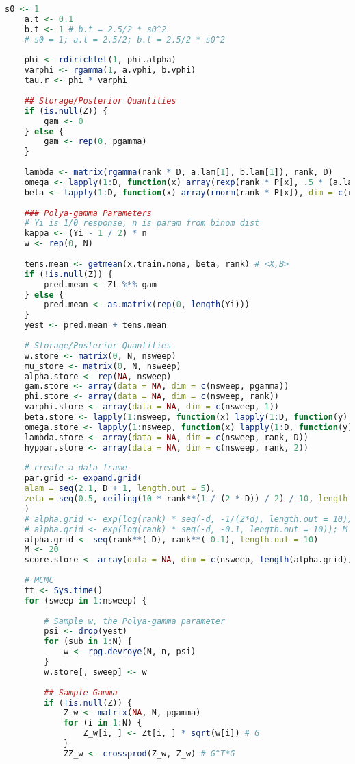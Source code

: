 \documentclass[AutoFakeBold]{LZUThesis}
\begin{document}
\begin{lstlisting}[language = R, caption = {BT-LR}算法]
	s0 <- 1
	a.t <- 0.1
	b.t <- 1 # b.t = 2.5/2 * s0^2
	# s0 = 1; a.t = 2.5/2; b.t = 2.5/2 * s0^2
	
	phi <- rdirichlet(1, phi.alpha)
	varphi <- rgamma(1, a.vphi, b.vphi)
	tau.r <- phi * varphi
	
	## Storage/Posterior Quantities
	if (is.null(Z)) {
		gam <- 0
	} else {
		gam <- rep(0, pgamma)
	}
	
	lambda <- matrix(rgamma(rank * D, a.lam[1], b.lam[1]), rank, D)
	omega <- lapply(1:D, function(x) array(rexp(rank * P[x], .5 * (a.lam[1] / b.lam[1])), dim = c(rank, P[x])))
	beta <- lapply(1:D, function(x) array(rnorm(rank * P[x]), dim = c(rank, P[x]))) # D*rank*P_d
	
	### Polya-gamma Parameters
	# Yi is 1/0 response, n is param from binom dist
	kappa <- (Yi - 1 / 2) * n
	w <- rep(0, N)
	
	tens.mean <- getmean(x.train.nona, beta, rank) # <X,B>
	if (!is.null(Z)) {
		pred.mean <- Zt %*% gam
	} else {
		pred.mean <- as.matrix(rep(0, length(Yi)))
	}
	yest <- pred.mean + tens.mean
	
	# Storage/Posterior Quantities
	w.store <- matrix(0, N, nsweep)
	mu_store <- matrix(0, N, nsweep)
	alpha.store <- rep(NA, nsweep)
	gam.store <- array(data = NA, dim = c(nsweep, pgamma))
	phi.store <- array(data = NA, dim = c(nsweep, rank))
	varphi.store <- array(data = NA, dim = c(nsweep, 1))
	beta.store <- lapply(1:nsweep, function(x) lapply(1:D, function(y) array(dim = c(rank, P[y]))))
	omega.store <- lapply(1:nsweep, function(x) lapply(1:D, function(y) array(dim = c(rank, P[y]))))
	lambda.store <- array(data = NA, dim = c(nsweep, rank, D))
	hyppar.store <- array(data = NA, dim = c(nsweep, rank, 2))
	
	# create a data frame
	par.grid <- expand.grid(
	alam = seq(2.1, D + 1, length.out = 5),
	zeta = seq(0.5, ceiling(10 * rank**(1 / (2 * D)) / 2) / 10, length.out = 5)
	)
	# alpha.grid <- exp(log(rank) * seq(-d, -1/(2*d), length.out = 10)); M <- 10
	# alpha.grid <- exp(log(rank) * seq(-d, -0.1, length.out = 10)); M <- 20
	alpha.grid <- seq(rank**(-D), rank**(-0.1), length.out = 10)
	M <- 20
	score.store <- array(data = NA, dim = c(nsweep, length(alpha.grid)))
	
	# MCMC 
	tt <- Sys.time()
	for (sweep in 1:nsweep) {
		
		# Sample w, the Polya-gamma parameter
		psi <- drop(yest)
		for (sub in 1:N) {
			w <- rpg.devroye(N, n, psi)
		}
		w.store[, sweep] <- w
		
		## Sample Gamma
		if (!is.null(Z)) {
			Z_w <- matrix(NA, N, pgamma)
			for (i in 1:N) {
				Z_w[i, ] <- Zt[i, ] * sqrt(w[i]) # G
			}
			ZZ_w <- crossprod(Z_w, Z_w) # G^T*G
			

\end{lstlisting}
\end{document}
